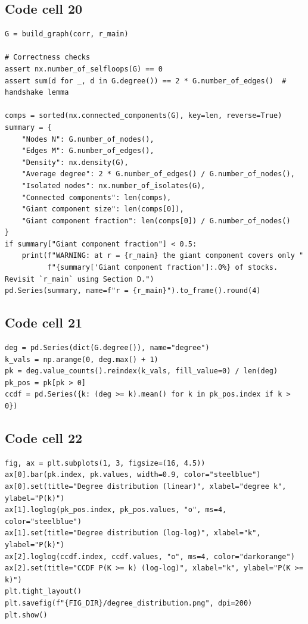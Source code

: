 \documentclass[12pt,a4paper]{report}
\begin{document}
\subsection*{Code cell 20}
\begin{lstlisting}[style=fancy]
G = build_graph(corr, r_main)

# Correctness checks
assert nx.number_of_selfloops(G) == 0
assert sum(d for _, d in G.degree()) == 2 * G.number_of_edges()  # handshake lemma

comps = sorted(nx.connected_components(G), key=len, reverse=True)
summary = {
    "Nodes N": G.number_of_nodes(),
    "Edges M": G.number_of_edges(),
    "Density": nx.density(G),
    "Average degree": 2 * G.number_of_edges() / G.number_of_nodes(),
    "Isolated nodes": nx.number_of_isolates(G),
    "Connected components": len(comps),
    "Giant component size": len(comps[0]),
    "Giant component fraction": len(comps[0]) / G.number_of_nodes()
}
if summary["Giant component fraction"] < 0.5:
    print(f"WARNING: at r = {r_main} the giant component covers only "
          f"{summary['Giant component fraction']:.0%} of stocks. Revisit `r_main` using Section D.")
pd.Series(summary, name=f"r = {r_main}").to_frame().round(4)
\end{lstlisting}

\subsection*{Code cell 21}
\begin{lstlisting}[style=fancy]
deg = pd.Series(dict(G.degree()), name="degree")
k_vals = np.arange(0, deg.max() + 1)
pk = deg.value_counts().reindex(k_vals, fill_value=0) / len(deg)
pk_pos = pk[pk > 0]
ccdf = pd.Series({k: (deg >= k).mean() for k in pk_pos.index if k > 0})
\end{lstlisting}

\subsection*{Code cell 22}
\begin{lstlisting}[style=fancy]
fig, ax = plt.subplots(1, 3, figsize=(16, 4.5))
ax[0].bar(pk.index, pk.values, width=0.9, color="steelblue")
ax[0].set(title="Degree distribution (linear)", xlabel="degree k", ylabel="P(k)")
ax[1].loglog(pk_pos.index, pk_pos.values, "o", ms=4, color="steelblue")
ax[1].set(title="Degree distribution (log-log)", xlabel="k", ylabel="P(k)")
ax[2].loglog(ccdf.index, ccdf.values, "o", ms=4, color="darkorange")
ax[2].set(title="CCDF P(K >= k) (log-log)", xlabel="k", ylabel="P(K >= k)")
plt.tight_layout()
plt.savefig(f"{FIG_DIR}/degree_distribution.png", dpi=200)
plt.show()
\end{lstlisting}
\end{document}
